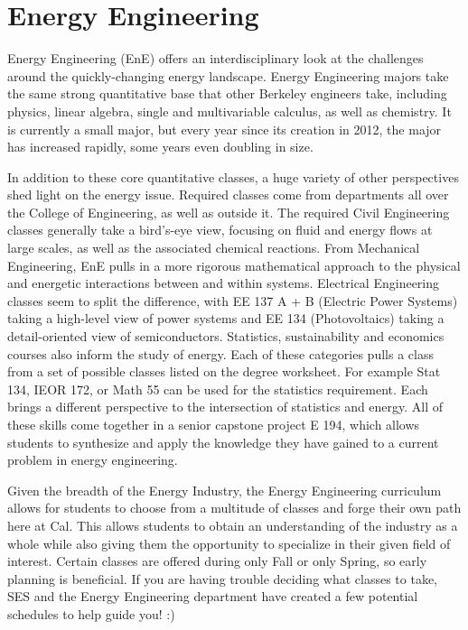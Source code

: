 \chapter*{Energy Engineering}

Energy Engineering (EnE) offers an interdisciplinary look at the challenges around the quickly-changing energy landscape. Energy Engineering majors take the same strong quantitative base that other Berkeley engineers take, including physics, linear algebra, single and multivariable calculus, as well as chemistry. It is currently a small major, but every year since its creation in 2012, the major has increased rapidly, some years even doubling in size.

In addition to these core quantitative classes, a huge variety of other perspectives shed light on the energy issue. Required classes come from departments all over the College of Engineering, as well as outside it. The required Civil Engineering classes generally take a bird’s-eye view, focusing on fluid and energy flows at large scales, as well as the associated chemical reactions. From Mechanical Engineering, EnE pulls in a more rigorous mathematical approach to the physical and energetic interactions between and within systems. Electrical Engineering classes seem to split the difference, with EE 137 A + B (Electric Power Systems) taking a high-level view of power systems and EE 134 (Photovoltaics) taking a detail-oriented view of semiconductors. Statistics, sustainability and economics courses also inform the study of energy. Each of these categories pulls a class from a set of possible classes listed on the degree worksheet. For example Stat 134, IEOR 172, or Math 55 can be used for the statistics requirement. Each brings a different perspective to the intersection of statistics and energy. All of these skills come together in a senior capstone project E 194, which allows students to synthesize and apply the knowledge they have gained to a current problem in energy engineering.

Given the breadth of the Energy Industry, the Energy Engineering curriculum allows for students to choose from a multitude of classes and forge their own path here at Cal. This allows students to obtain an understanding of the industry as a whole while also giving them the opportunity to specialize in their given field of interest. Certain classes are offered during only Fall or only Spring, so early planning is beneficial. If you are having trouble deciding what classes to take, SES and the Energy Engineering department have created a few potential schedules to help guide you! :)
 

